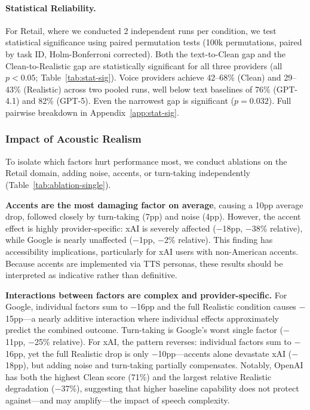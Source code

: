 \paragraph{Statistical Reliability.} For Retail, where we conducted 2 independent runs per condition, we test statistical significance using paired permutation tests (100k permutations, paired by task ID, Holm-Bonferroni corrected). Both the text-to-Clean gap and the Clean-to-Realistic gap are statistically significant for all three providers (all $p < 0.05$; Table~\ref{tab:stat-sig}). Voice providers achieve 42--68\% (Clean) and 29--43\% (Realistic) across two pooled runs, well below text baselines of 76\% (GPT-4.1) and 82\% (GPT-5). Even the narrowest gap is significant ($p = 0.032$). Full pairwise breakdown in Appendix~\ref{app:stat-sig}.

\subsubsection{Impact of Acoustic Realism}

To isolate which factors hurt performance most, we conduct ablations on the Retail domain, adding noise, accents, or turn-taking independently (Table~\ref{tab:ablation-single}).



\textbf{Accents are the most damaging factor on average}, causing a 10pp average drop, followed closely by turn-taking (7pp) and noise (4pp). However, the accent effect is highly provider-specific: xAI is severely affected ($-$18pp, $-$38\% relative), while Google is nearly unaffected ($-$1pp, $-$2\% relative). This finding has accessibility implications, particularly for xAI users with non-American accents. Because accents are implemented via TTS personas, these results should be interpreted as indicative rather than definitive.

\textbf{Interactions between factors are complex and provider-specific.} For Google, individual factors sum to $-$16pp and the full Realistic condition causes $-$15pp---a nearly additive interaction where individual effects approximately predict the combined outcome. Turn-taking is Google's worst single factor ($-$11pp, $-$25\% relative). For xAI, the pattern reverses: individual factors sum to $-$16pp, yet the full Realistic drop is only $-$10pp---accents alone devastate xAI ($-$18pp), but adding noise and turn-taking partially compensates. Notably, OpenAI has both the highest Clean score (71\%) and the largest relative Realistic degradation ($-$37\%), suggesting that higher baseline capability does not protect against---and may amplify---the impact of speech complexity.

